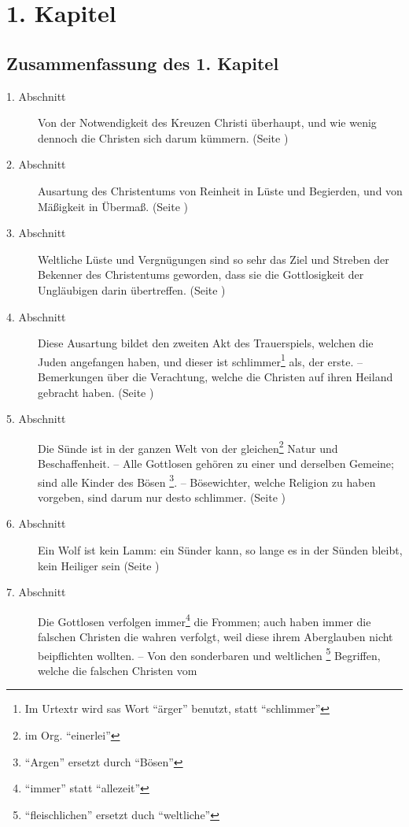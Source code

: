 


\chapter{1. Kapitel} \label{kap1} 

\section{Zusammenfassung des 1. Kapitel}
\small
\begin{description}
\item[1. Abschnitt] Von der Notwendigkeit des Kreuzen Christi überhaupt, und
wie wenig dennoch die Christen sich darum kümmern. (Seite \pageref{kap1_ab1})
\item[2. Abschnitt] Ausartung des Christentums von Reinheit in Lüste und
Begierden, und von Mäßigkeit in Übermaß. (Seite \pageref{kap1_ab2})
\item[3. Abschnitt] Weltliche Lüste und Vergnügungen sind so sehr das Ziel und
Streben der Bekenner des Christentums geworden, dass sie die Gottlosigkeit der
Ungläubigen darin übertreffen. (Seite \pageref{kap1_ab3})
\item[4. Abschnitt]  Diese Ausartung bildet den zweiten Akt des Trauerspiels,
welchen die Juden angefangen haben, und dieser ist schlimmer\footnote{Im Urtextr
wird sas Wort "`ärger"' benutzt, statt "`schlimmer"'} als, der erste. --
Bemerkungen über die Verachtung, welche die Christen auf ihren Heiland gebracht
haben. (Seite \pageref{kap1_ab4})
\item[5. Abschnitt] Die Sünde ist in der ganzen Welt von der
gleichen\footnote{im Org. "`einerlei"'} Natur und Beschaffenheit. -- Alle
Gottlosen gehören zu einer und derselben Gemeine;  
sind alle Kinder des Bösen \footnote{"`Argen"' ersetzt durch "`Bösen"'}. --
Bösewichter, welche Religion zu haben vorgeben, sind darum nur desto schlimmer.
(Seite \pageref{kap1_ab5})
\item[6. Abschnitt] Ein Wolf ist kein Lamm: ein Sünder kann, so lange es in der
Sünden bleibt, kein Heiliger sein (Seite \pageref{kap1_ab6})
\item[7. Abschnitt] Die Gottlosen verfolgen immer\footnote{"`immer"' statt
"`allezeit"'} die Frommen; auch haben immer die falschen Christen die wahren
verfolgt, weil diese ihrem Aberglauben nicht beipflichten wollten. -- Von den
sonderbaren und weltlichen \footnote{"`fleischlichen"' ersetzt duch "`weltliche"'} 
Begriffen, welche die falschen Christen vom

\end{description}
